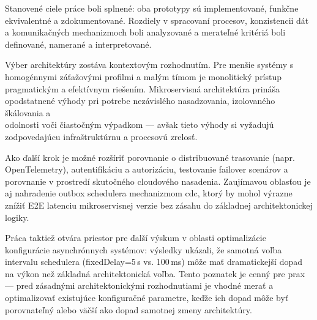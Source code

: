 Stanovené ciele práce boli splnené: oba prototypy sú implementované, funkčne ekvivalentné a zdokumentované. Rozdiely v spracovaní procesov, konzistencii dát a komunikačných mechanizmoch boli analyzované a merateľné kritériá boli definované, namerané a interpretované.

Výber architektúry zostáva kontextovým rozhodnutím. Pre menšie systémy s homogénnymi záťažovými profilmi a malým tímom je monolitický prístup pragmatickým a efektívnym riešením. Mikroservisná architektúra prináša opodstatnené výhody pri potrebe nezávislého nasadzovania, izolovaného škálovania a \\ odolnosti voči čiastočným výpadkom — avšak tieto výhody si vyžadujú zodpovedajúcu infraštruktúrnu a procesovú zrelosť.

Ako ďalší krok je možné rozšíriť porovnanie o distribuované trasovanie (napr. OpenTelemetry), autentifikáciu a autorizáciu, testovanie failover scenárov a porovnanie v prostredí skutočného cloudového nasadenia. Zaujímavou oblasťou je aj nahradenie outbox schedulera mechanizmom \gls{cdc}, ktorý by mohol výrazne znížiť E2E latenciu mikroservisnej verzie bez zásahu do základnej architektonickej logiky.

Práca taktiež otvára priestor pre ďalší výskum v oblasti optimalizácie konfigurácie asynchrónnych systémov: výsledky ukázali, že samotná voľba intervalu schedulera (fixedDelay=5\,s vs. 100\,ms) môže mať dramatickejší dopad na výkon než základná architektonická voľba. Tento poznatek je cenný pre prax — pred zásadnými architektonickými rozhodnutiami je vhodné merať a optimalizovať existujúce konfiguračné parametre, keďže ich dopad môže byť porovnateľný alebo väčší ako dopad samotnej zmeny architektúry.
